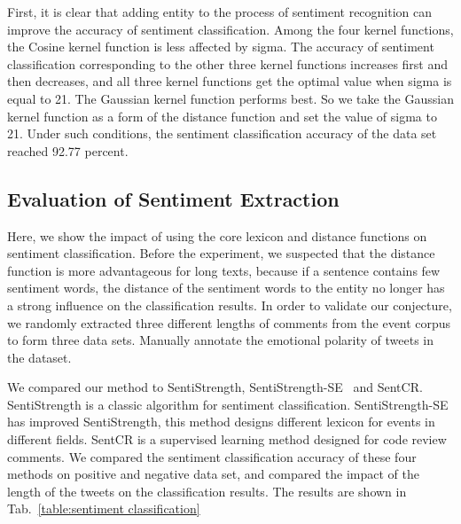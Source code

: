 \documentclass[runningheads]{llncs}
\begin{document}
First, it is clear that adding entity to the process of sentiment recognition can improve the accuracy of sentiment classification. Among the four kernel functions, the Cosine kernel function is less affected by sigma. The accuracy of sentiment classification corresponding to the other three kernel functions increases first and then decreases, and all three kernel functions get the optimal value when sigma is equal to 21. The Gaussian kernel function performs best. So we take the Gaussian kernel function as a form of the distance function and set the value of sigma to 21. Under such conditions, the sentiment classification accuracy of the data set reached 92.77 percent.

\subsection{Evaluation of Sentiment Extraction}
Here, we show the impact of using the core lexicon and distance functions on sentiment classification. Before the experiment, we suspected that the distance function is more advantageous for long texts, because if a sentence contains few sentiment words, the distance of the sentiment words to the entity no longer has a strong influence on the classification results. In order to validate our conjecture, we randomly extracted three different lengths of comments from the event corpus to form three data sets. Manually annotate the emotional polarity of tweets in the dataset.

We compared our method to SentiStrength, SentiStrength-SE~\cite{Rakibul2017SentiStrength-SE} and SentCR. SentiStrength is a classic algorithm for sentiment classification. SentiStrength-SE has improved SentiStrength, this method designs different lexicon for events in different fields. SentCR is a supervised learning method designed for code review comments. We compared the sentiment classification accuracy of these four methods on positive and negative data set, and compared the impact of the length of the tweets on the classification results. The results are shown in Tab.~\ref{table:sentiment classification}
\end{document}
